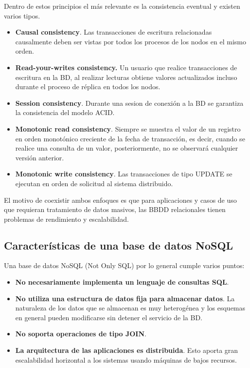 Dentro de estos principios el más relevante es la consistencia eventual y existen varios tipos.
\begin{itemize}
	\item \textbf{Causal consistency}. Las transacciones de escritura relacionadas causalmente deben ser vistas por todos los procesos de los nodos en el mismo orden.
	\item \textbf{Read-your-writes consistency.} Un usuario que realice transacciones de escritura en la BD, al realizar lecturas obtiene valores actualizados incluso durante el proceso de réplica en todos los nodos.
	\item \textbf{Session consistency}. Durante una sesion de conexión a la BD se garantiza la consistencia del modelo ACID.
	\item \textbf{Monotonic read consistency}. Siempre se muestra el valor de un registro en orden monotónico creciente de la fecha de transacción, es decir, cuando se realice una consulta de un valor, posteriormente, no se observará cualquier versión anterior.
	\item \textbf{Monotonic write consistency}. Las transacciones de tipo UPDATE se ejecutan en orden de solicitud al sistema distribuido.
\end{itemize}
El motivo de coexistir ambos enfoques es que para aplicaciones y casos de uso que requieran tratamiento de datos masivos, las BBDD relacionales tienen problemas de rendimiento y escalabilidad.
\subsection{Características de una base de datos NoSQL}
Una base de datos NoSQL (Not Only SQL) por lo general cumple varios puntos:
\begin{itemize}
	\item \textbf{No necesariamente implementa un lenguaje de consultas SQL}.
\item \textbf{No utiliza una estructura de datos fija para almacenar datos}. La naturaleza de los datos que se almacenan es muy heterogénea y los esquemas en general pueden modificarse sin detener el servicio de la BD. 
\item \textbf{No soporta operaciones de tipo JOIN}.
\item \textbf{La arquitectura de las aplicaciones es distribuida}. Esto aporta gran escalabilidad horizontal a los sistemas usando máquinas de bajos recursos.
\end{itemize}
